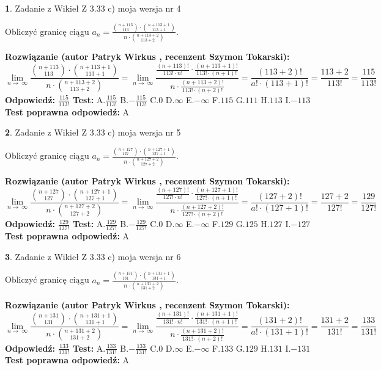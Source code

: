 \documentclass[12pt, a4paper]{article}
\theoremstyle{definition} %
\newtheorem{zad}{}
\newcommand{\zadStart}[1]{\begin{zad}#1\newline}
\newcommand{\zadStop}{\end{zad}}
\newcommand{\rozwStart}[2]{\noindent \textbf{Rozwiązanie (autor #1 , recenzent #2): }\newline}
\newcommand{\rozwStop}{\newline}
\newcommand{\odpStart}{\noindent \textbf{Odpowiedź:}\newline}
\newcommand{\odpStop}{\newline}
\newcommand{\testStart}{\noindent \textbf{Test:}\newline}
\newcommand{\testStop}{\newline}
\newcommand{\kluczStart}{\noindent \textbf{Test poprawna odpowiedź:}\newline}
\newcommand{\kluczStop}{\newline}
\begin{document}
\zadStart{Zadanie z Wikieł Z 3.33 c) moja wersja nr 4}

Obliczyć granicę ciągu $a_{n}=\frac{{n+113\choose113}\cdot{n+113+1\choose113+1}}{n\cdot{n+113+2\choose113+2}}$.
\zadStop
\rozwStart{Patryk Wirkus}{Szymon Tokarski}
$$\lim\limits_{n\to\ \infty}\frac{{n+113\choose113}\cdot{n+113+1\choose113+1}}{n\cdot{n+113+2\choose113+2}} = \lim\limits_{n\to\ \infty}\frac{\frac{(n+113)!}{113! \cdot n!}\cdot \frac{(n+113+1)!}{113! \cdot (n+1)!}}{n\cdot \frac{(n+113+2)!}{113! \cdot (n+2)!}} = \frac{(113+2)!}{a!\cdot (113+1)!} = \frac{113+2}{113!} = \frac{115}{113!}$$
\rozwStop
\odpStart
$\frac{115}{113!}$
\odpStop
\testStart
A.$\frac{115}{113!}$ B.$-\frac{115}{113!}$ C.$0$ D.$\infty$ E.$-\infty$
F.$115$ G.$111$
H.$113$
I.$-113$
\testStop
\kluczStart
A
\kluczStop



\zadStart{Zadanie z Wikieł Z 3.33 c) moja wersja nr 5}

Obliczyć granicę ciągu $a_{n}=\frac{{n+127\choose127}\cdot{n+127+1\choose127+1}}{n\cdot{n+127+2\choose127+2}}$.
\zadStop
\rozwStart{Patryk Wirkus}{Szymon Tokarski}
$$\lim\limits_{n\to\ \infty}\frac{{n+127\choose127}\cdot{n+127+1\choose127+1}}{n\cdot{n+127+2\choose127+2}} = \lim\limits_{n\to\ \infty}\frac{\frac{(n+127)!}{127! \cdot n!}\cdot \frac{(n+127+1)!}{127! \cdot (n+1)!}}{n\cdot \frac{(n+127+2)!}{127! \cdot (n+2)!}} = \frac{(127+2)!}{a!\cdot (127+1)!} = \frac{127+2}{127!} = \frac{129}{127!}$$
\rozwStop
\odpStart
$\frac{129}{127!}$
\odpStop
\testStart
A.$\frac{129}{127!}$ B.$-\frac{129}{127!}$ C.$0$ D.$\infty$ E.$-\infty$
F.$129$ G.$125$
H.$127$
I.$-127$
\testStop
\kluczStart
A
\kluczStop



\zadStart{Zadanie z Wikieł Z 3.33 c) moja wersja nr 6}

Obliczyć granicę ciągu $a_{n}=\frac{{n+131\choose131}\cdot{n+131+1\choose131+1}}{n\cdot{n+131+2\choose131+2}}$.
\zadStop
\rozwStart{Patryk Wirkus}{Szymon Tokarski}
$$\lim\limits_{n\to\ \infty}\frac{{n+131\choose131}\cdot{n+131+1\choose131+1}}{n\cdot{n+131+2\choose131+2}} = \lim\limits_{n\to\ \infty}\frac{\frac{(n+131)!}{131! \cdot n!}\cdot \frac{(n+131+1)!}{131! \cdot (n+1)!}}{n\cdot \frac{(n+131+2)!}{131! \cdot (n+2)!}} = \frac{(131+2)!}{a!\cdot (131+1)!} = \frac{131+2}{131!} = \frac{133}{131!}$$
\rozwStop
\odpStart
$\frac{133}{131!}$
\odpStop
\testStart
A.$\frac{133}{131!}$ B.$-\frac{133}{131!}$ C.$0$ D.$\infty$ E.$-\infty$
F.$133$ G.$129$
H.$131$
I.$-131$
\testStop
\kluczStart
A
\kluczStop
\end{document}
